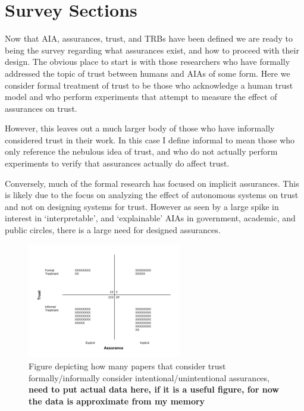 \section{Survey Sections} \label{sec:survey}
Now that AIA, assurances, trust, and TRBs have been defined we are ready to being the survey regarding what assurances exist, and how to proceed with their design. The obvious place to start is with those researchers who have formally addressed the topic of trust between humans and AIAs of some form. Here we consider formal treatment of trust to be those who acknowledge a human trust model and who perform experiments that attempt to measure the effect of assurances on trust.

However, this leaves out a much larger body of those who have informally considered trust in their work. In this case I define informal to mean those who only reference the nebulous idea of trust, and who do not actually perform experiments to verify that assurances actually do affect trust.

Conversely, much of the formal research has focused on implicit assurances. This is likely due to the focus on analyzing the effect of autonomous systems on trust and not on designing systems for trust. However as seen by a large spike in interest in `interpretable', and `explainable' AIAs in government, academic, and public circles, there is a large need for designed assurances.

\begin{figure}[htbp]
    \centering
    \includegraphics[width=0.6\textwidth]{Figures/Trust_vs_Assurance_Intention.pdf}
    \caption{Figure depicting how many papers that consider trust formally/informally consider intentional/unintentional assurances, \textbf{need to put actual data here, if it is a useful figure, for now the data is approximate from my memory}}
    \label{fig:trust_assurance_intention}
\end{figure}


